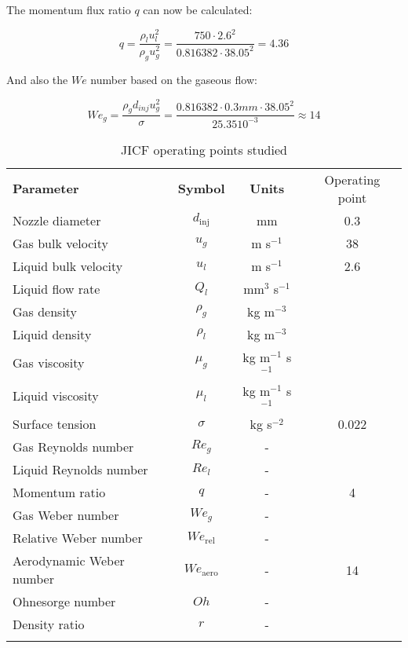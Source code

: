 The momentum flux ratio $q$ can now be calculated:

\begin{equation}
q = \frac{\rho_l u_l^2}{\rho_g u_g^2} = \frac{750 \cdot 2.6^2}{0.816382 \cdot 38.05^2} = 4.36
\end{equation}

And also the $We$ number based on the gaseous flow:

\begin{equation}
We_g = \frac{\rho_g d_{inj} u_g^2}{\sigma} = \frac{0.816382 \cdot 0.3 mm \cdot 38.05^2}{25.35 10^{-3}} \approx 14
\end{equation}

\begin{table}[!h]
\centering
\caption{JICF operating points studied}
\begin{tabular}{lccc}
\thickhline
\textbf{Parameter} & \textbf{Symbol} & \textbf{Units} &  Operating point \\
\thickhline
Nozzle diameter & $d_\mathrm{inj}$ & mm & 0.3 \\
Gas bulk velocity & $u_g$ & m s$^{-1}$ & 38 \\
Liquid bulk velocity & $u_l$ & m s$^{-1}$ & 2.6  \\
Liquid flow rate & $Q_l$ & mm$^3$ s$^{-1}$ &   \\
Gas density & $\rho_g$ & kg m$^{-3}$ &  \\
Liquid density & $\rho_l$ & kg m$^{-3}$ &  \\
Gas viscosity & $\mu_g$ & kg m$^{-1}$ s$^{-1}$ &  \\
Liquid viscosity & $\mu_l$ & kg m$^{-1}$ s$^{-1}$ &   \\
Surface tension & $\sigma$ & kg s$^{-2}$ &  0.022  \\
\thickhline
Gas Reynolds number & $Re_g$ & - & \\
Liquid Reynolds number & $Re_l$ & - &  \\
Momentum ratio & $q$ & - & 4  \\
Gas Weber number & $We_g$ & - &  \\
Relative Weber number & $We_\mathrm{rel}$ & - & \\
Aerodynamic Weber number & $We_\mathrm{aero}$ & - & 14 \\
Ohnesorge number & $Oh $ & - & \\
Density ratio & $r$ & - & \\
\thickhline
\end{tabular}
\label{tab:bimer_sps_operating_point}
\end{table}

